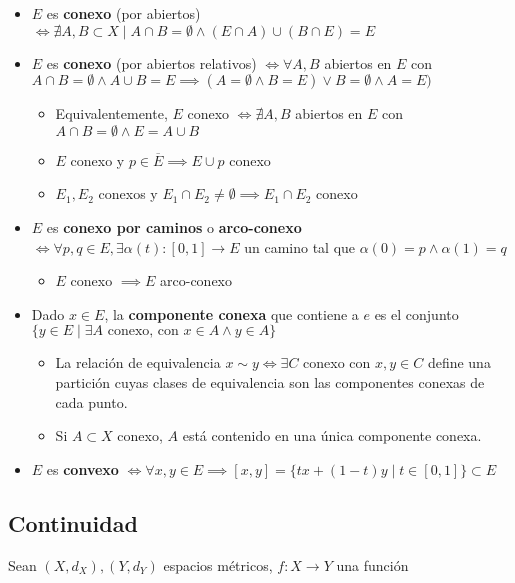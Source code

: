 \documentclass[a4paper,twocolumn]{extarticle}
\begin{document}
\begin{itemize}
	\item $E$ es \textbf{conexo} (por abiertos) $\iff \nexists A, B \subset X \mid A \cap B = \emptyset \land (E \cap A) \cup (B \cap E) = E$
	\item $E$ es \textbf{conexo} (por abiertos relativos) $\iff \forall A,B$ abiertos en $E$ con $A \cap B = \emptyset \land A \cup B = E \implies (A = \emptyset \land B = E) \lor B = \emptyset \land A = E)$
	\begin{itemize}
		\item Equivalentemente, $E$ conexo $\iff \nexists A,B$ abiertos en $E$ con $A\cap B = \emptyset \land E = A \cup B$
		\item $E$ conexo y $p \in \overline{E} \implies E \cup p$ conexo
		\item $E_1, E_2$ conexos y $E_1 \cap E_2 \neq \emptyset \implies E_1 \cap E_2$ conexo
	\end{itemize}
	\item $E$ es \textbf{conexo por caminos} o \textbf{arco-conexo} $\iff \forall p,q \in E, \exists \alpha(t):[0,1] \to E$ un camino tal que $\alpha(0) = p \land \alpha(1) = q$
	\begin{itemize}
		\item $E$ conexo $\implies E$ arco-conexo
	\end{itemize}
	\item Dado $x \in E$, la \textbf{componente conexa} que contiene a $e$ es el conjunto $\{y \in E \mid \exists A \text{ conexo, con } x \in A \land y \in A\}$
	\begin{itemize}
		\item La relación de equivalencia $x\sim y \iff \exists C$ conexo con $x,y \in C$ define una partición cuyas clases de equivalencia son las componentes conexas de cada punto.
		\item Si $A \subset X$ conexo, $A$ está contenido en una única componente conexa.
	\end{itemize}
	\item $E$ es \textbf{convexo} $\iff \forall x, y \in E \implies [x,y] = \{tx + (1-t)y \mid t \in [0,1]\} \subset E$
\end{itemize}

\subsection{Continuidad}

Sean $(X, d_X), (Y, d_Y)$ espacios métricos, $f:X \to Y$ una función
\end{document}
